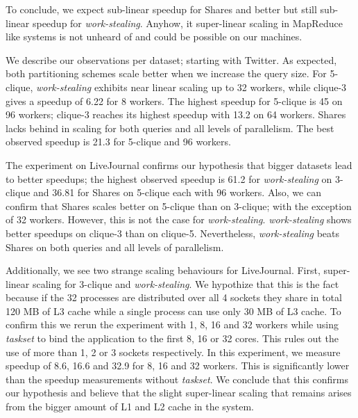 To conclude, we expect sub-linear speedup for Shares and better but still sub-linear speedup for \textit{work-stealing}.
Anyhow, it super-linear scaling in MapReduce like systems is not unheard of and could be possible on our machines.

We describe our observations per dataset;
starting with Twitter.
As expected, both partitioning schemes scale better when we increase the query size.
For 5-clique, \textit{work-stealing} exhibits near linear scaling up to 32 workers, while
clique-3 gives a speedup of 6.22 for 8 workers.
The highest speedup for 5-clique is 45 on 96 workers; clique-3 reaches its highest speedup
with 13.2 on 64 workers.
Shares lacks behind in scaling for both queries and all levels of parallelism.
The best observed speedup is 21.3 for 5-clique and 96 workers.

The experiment on LiveJournal confirms our hypothesis that bigger datasets lead to better
speedups;
the highest observed speedup is 61.2 for \textit{work-stealing} on 3-clique and
36.81 for Shares on 5-clique each with 96 workers.
Also, we can confirm that Shares scales better on 5-clique than on 3-clique; with the exception of 32 workers.
However, this is not the case for \textit{work-stealing}.
\textit{work-stealing} shows better speedups on clique-3 than on clique-5.
Nevertheless, \textit{work-stealing} beats Shares on both queries and all levels of parallelism.


Additionally, we see two strange scaling behaviours for LiveJournal.
First, super-linear scaling for 3-clique and \textit{work-stealing}.
We hypothize that this is the fact because if the 32 processes are distributed over all 4 sockets they share in total
120 MB of L3 cache while a single process can use only 30 MB of L3 cache.
To confirm this we rerun the experiment with 1, 8, 16 and 32 workers while using \textit{taskset} to bind the application
to the first 8, 16 or 32 cores.
This rules out the use of more than 1, 2 or 3 sockets respectively.
In this experiment, we measure speedup of 8.6, 16.6 and 32.9 for 8, 16 and 32 workers.
This is significantly lower than the speedup measurements without \textit{taskset}.
We conclude that this confirms our hypothesis and believe that the slight super-linear
scaling that remains arises from the bigger amount of L1 and L2 cache in the system.


